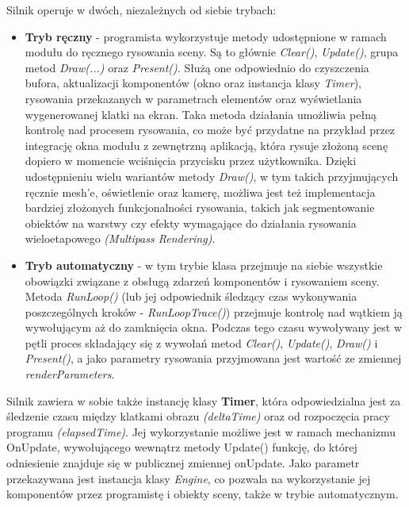 	Silnik operuje w dwóch, niezależnych od siebie trybach:
	\begin{itemize}
		\item \textbf{Tryb ręczny} - programista wykorzystuje metody udostępnione w ramach modułu do ręcznego rysowania sceny. Są to głównie \textit{Clear()}, \textit{Update()}, grupa metod \textit{Draw(...)} oraz \textit{Present()}. Służą one odpowiednio do czyszczenia bufora, aktualizacji komponentów (okno oraz instancja klasy \textit{Timer}), rysowania przekazanych w parametrach elementów oraz wyświetlania wygenerowanej klatki na ekran. Taka metoda działania umożliwia pełną kontrolę nad procesem rysowania, co może być przydatne na przykład przez integrację okna modułu z zewnętrzną aplikacją, która rysuje złożoną scenę dopiero w momencie wciśnięcia przycisku przez użytkownika. Dzięki udostępnieniu wielu wariantów metody \textit{Draw()}, w tym takich przyjmujących ręcznie mesh'e, oświetlenie oraz kamerę, możliwa jest też implementacja bardziej złożonych funkcjonalności rysowania, takich jak segmentowanie obiektów na warstwy czy efekty wymagające do działania rysowania wieloetapowego \textit{(Multipass Rendering)}.
		\item \textbf{Tryb automatyczny} - w tym trybie klasa przejmuje na siebie wszystkie obowiązki związane z obsługą zdarzeń komponentów i rysowaniem sceny. Metoda \textit{RunLoop()} (lub jej odpowiednik śledzący czas wykonywania poszczególnych kroków - \textit{RunLoopTrace()}) przejmuje kontrolę nad wątkiem ją wywołującym aż do zamknięcia okna. Podczas tego czasu wywoływany jest w pętli proces składający się z wywołań metod \textit{Clear()}, \textit{Update()}, \textit{Draw()} i \textit{Present()}, a jako parametry rysowania przyjmowana jest wartość ze zmiennej \textit{renderParameters}.
	\end{itemize}
	
	Silnik zawiera w sobie także instancję klasy \textbf{Timer}, która odpowiedzialna jest za śledzenie czasu między klatkami obrazu \textit{(deltaTime)} oraz od rozpoczęcia pracy programu \textit{(elapsedTime)}. Jej wykorzystanie możliwe jest w ramach mechanizmu OnUpdate, wywołującego wewnątrz metody Update() funkcję, do której odniesienie znajduje się w publicznej zmiennej onUpdate. Jako parametr przekazywana jest instancja klasy \textit{Engine}, co pozwala na wykorzystanie jej komponentów przez programistę i obiekty sceny, także w trybie automatycznym.
	
